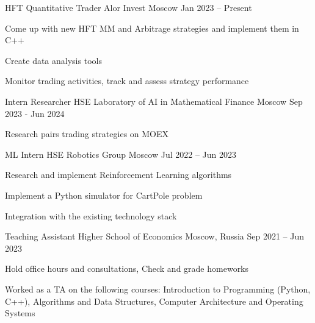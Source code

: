 \documentclass[a4paper, 10pt]{awesome-cv}
\begin{document}
\vspace{-5mm}
\begin{cventries}
	\cventry
	{HFT Quantitative Trader}
	{Alor Invest}
	{Moscow}
	{Jan 2023 – Present}
	{\begin{cvitems}
			\item {Come up with new HFT MM and Arbitrage strategies and implement them in C++}
			\item {Create data analysis tools}
			\item {Monitor trading activities, track and assess strategy performance}
		\end{cvitems}}

	\cventry
	{Intern Researcher}
	{HSE Laboratory of AI in Mathematical Finance}
	{Moscow}
	{Sep 2023 - Jun 2024}
	{\begin{cvitems}
			\item{Research pairs trading strategies on MOEX}
		\end{cvitems}
	}

	\cventry
	{ML Intern}
	{HSE Robotics Group}
	{Moscow}
	{Jul 2022 – Jun 2023}
	{\begin{cvitems}
			\item {Research and implement Reinforcement Learning algorithms}
			\item {Implement a Python simulator for CartPole problem}
			\item {Integration with the existing technology stack}
		\end{cvitems}}

	\cventry
	{Teaching Assistant}
	{Higher School of Economics}
	{Moscow, Russia}
	{Sep 2021 – Jun 2023}
	{\begin{cvitems}
			\item {Hold office hours and consultations, Check and grade homeworks}
			\item {Worked as a TA on the following courses: Introduction to Programming (Python, C++), Algorithms and Data Structures, Computer Architecture and Operating Systems}
		\end{cvitems}}
\end{cventries}
\end{document}
